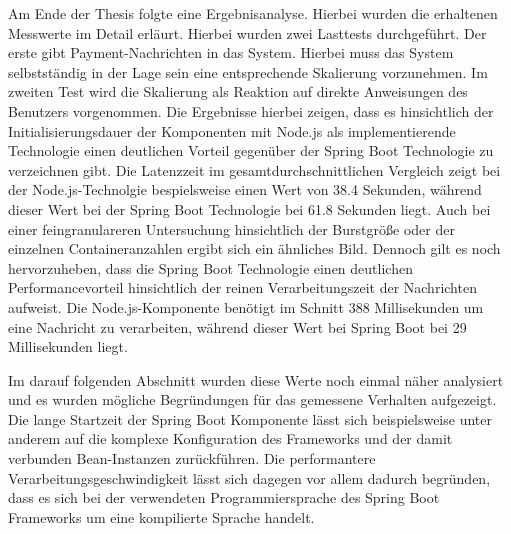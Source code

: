 Am Ende der Thesis folgte eine Ergebnisanalyse. Hierbei wurden die erhaltenen Messwerte im Detail erläurt. Hierbei wurden zwei Lasttests durchgeführt. Der erste gibt Payment-Nachrichten in das System. Hierbei muss das System selbstständig in der Lage sein eine entsprechende Skalierung vorzunehmen. Im zweiten Test wird die Skalierung als Reaktion auf direkte Anweisungen des Benutzers vorgenommen. Die Ergebnisse hierbei zeigen, dass es hinsichtlich der Initialisierungsdauer der Komponenten mit Node.js als implementierende Technologie einen deutlichen Vorteil gegenüber der Spring Boot Technologie zu verzeichnen gibt. Die Latenzzeit im gesamtdurchschnittlichen Vergleich zeigt bei der Node.js-Technolgie bespielsweise einen Wert von 38.4 Sekunden, während dieser Wert bei der Spring Boot Technologie bei 61.8 Sekunden liegt. Auch bei einer feingranulareren Untersuchung hinsichtlich der Burstgröße oder der einzelnen Containeranzahlen ergibt sich ein ähnliches Bild. Dennoch gilt es noch hervorzuheben, dass die Spring Boot Technologie einen deutlichen Performancevorteil hinsichtlich der reinen Verarbeitungszeit der Nachrichten aufweist. Die Node.js-Komponente benötigt im Schnitt 388 Millisekunden um eine Nachricht zu verarbeiten, während dieser Wert bei Spring Boot bei 29 Millisekunden liegt.

Im darauf folgenden Abschnitt wurden diese Werte noch einmal näher analysiert und es wurden mögliche Begründungen für das gemessene Verhalten aufgezeigt. Die lange Startzeit der Spring Boot Komponente lässt sich beispielsweise unter anderem auf die komplexe Konfiguration des Frameworks und der damit verbunden Bean-Instanzen zurückführen. Die performantere Verarbeitungsgeschwindigkeit lässt sich dagegen vor allem dadurch begründen, dass es sich bei der verwendeten Programmiersprache des Spring Boot Frameworks um eine kompilierte Sprache handelt.
